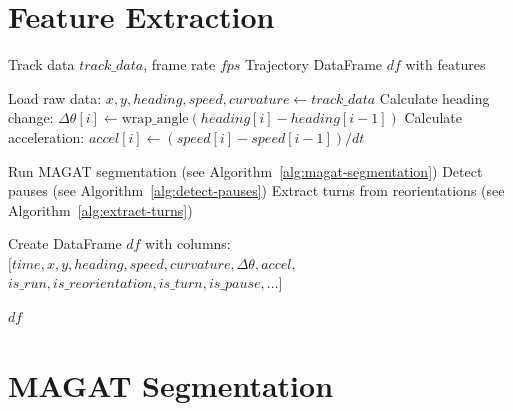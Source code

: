 \documentclass[
  11pt,
]{article}
\begin{document}
\hypertarget{feature-extraction}{%
\section{Feature Extraction}\label{feature-extraction}}

\begin{algorithm}[H]
\caption{Extract Trajectory Features}
\label{alg:extract-features}
\begin{algorithmic}[1]
\REQUIRE Track data $track\_data$, frame rate $fps$
\ENSURE Trajectory DataFrame $df$ with features

\STATE Load raw data: $x, y, heading, speed, curvature \leftarrow track\_data$
\STATE Calculate heading change: $\Delta\theta[i] \leftarrow \text{wrap\_angle}(heading[i] - heading[i-1])$
\STATE Calculate acceleration: $accel[i] \leftarrow (speed[i] - speed[i-1]) / dt$

\STATE Run MAGAT segmentation (see Algorithm~\ref{alg:magat-segmentation})
\STATE Detect pauses (see Algorithm~\ref{alg:detect-pauses})
\STATE Extract turns from reorientations (see Algorithm~\ref{alg:extract-turns})

\STATE Create DataFrame $df$ with columns:
\STATE \quad $[time, x, y, heading, speed, curvature, \Delta\theta, accel,$
\STATE \quad $is\_run, is\_reorientation, is\_turn, is\_pause, ...]$

\RETURN $df$
\end{algorithmic}
\end{algorithm}

\hypertarget{magat-segmentation}{%
\section{MAGAT Segmentation}\label{magat-segmentation}}
\end{document}

